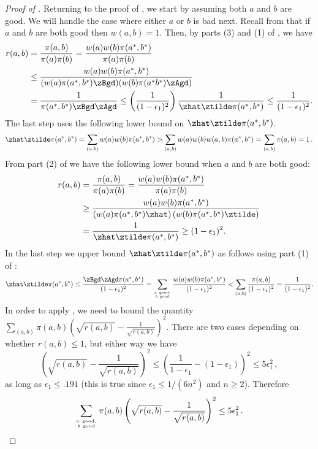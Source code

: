 \begin{proof}[Proof of ]
Returning to the proof of , we start by assuming 
both $a$ and $b$ are good.  We will handle the case where either $a$ or $b$ is bad next.  
Recall from  that if $a$ and $b$ are both good then $w(a,b) = 1$.  Then, by parts (3) and 
(1) of , we have
\begin{align*}
  r(a,b)&=\frac{\pi(a,b)}{\pi(a)\pi(b)}=\frac{w(a)w(b)\pi(a^*,b^*)}{\pi(a)\pi(b)}\\
  &\leq \frac{w(a)w(b)\pi(a^*,b^*)}{(w(a)\pi(a^*,b^*)\zBgd)(w(b) \pi(a^*b^*)\zAgd)}\\
  &= \frac{1}{\pi(a^*,b^*)\zBgd\zAgd}\leq \left(\frac{1}{(1-\epsilon_1)^2}\right) \frac{1}{\zhat\ztilde \pi(a^*,b^*)} \leq \frac{1}{(1-\epsilon_1)^2}.
\end{align*}
The last step uses the following lower bound on $\zhat\ztilde\pi(a^*,b^*)$.
 $$\zhat\ztilde\pi(a^*,b^*) =\sum_{(a,b)} w(a)w(b) \pi(a^*,b^*) > \sum_{(a,b)} w(a)w(b) w(a,b)\pi(a^*,b^*)  = \sum_{(a,b)} \pi(a,b) = 1\,.$$
From part (2) of  we have the following lower 
bound when $a$ and $b$ are both good:
\begin{align*}
  r(a,b)&=\frac{\pi(a,b)}{\pi(a)\pi(b)}=\frac{w(a)w(b)\pi(a^*,b^*)}{\pi(a)\pi(b)}\\
  &\geq \frac{w(a)w(b)\pi(a^*,b^*)}{
     \left(w(a)\pi(a^*,b^*)\zhat\right)\left(w(b)\pi(a^*,b^*)\ztilde\right)}\\
  &= \frac{1}{
     \zhat\ztilde\pi(a^*,b^*)} \geq(1-\epsilon_1)^2.
\end{align*}
In the last step we upper bound $\zhat\ztilde\pi(a^*,b^*)$ as follows 
using part (1) of :
\begin{equation*}\label{prodBound}
\zhat\ztilde\pi(a^*,b^*) \leq\frac{\zBgd\zAgd\pi(a^*,b^*)}{ (1-\epsilon_1)^{2}}= \sum_{a~\text{good},\atop b~\text{good}} \frac{w(a)w(b) \pi(a^*,b^*)}{(1-\epsilon_1)^{2}}< \sum_{(a,b)}\frac{ \pi(a,b)}{(1-\epsilon_1)^{2}} = \frac{1}{(1-\epsilon_1)^{2}}.
\end{equation*}
In order to apply , we need to bound the 
quantity $\sum_{(a,b)}\pi(a,b)\left(\sqrt{r(a,b)}-\frac{1}{\sqrt{r(a,b)}}\right)^2$.  
There are two cases depending on whether $r(a,b)\leq 1$, but either
way we have
\[\left(\sqrt{r(a,b)}-\frac{1}{\sqrt{r(a,b)}}\right)^2\leq
  \left(\frac{1}{1-\epsilon_1} - (1-\epsilon_1)\right)^2\leq
  5\epsilon_1^2\,,\]
as long as $\epsilon_1\leq .191$ (this is true since $\epsilon_1\leq 
1/(6n^2)$ and $n\geq 2$).  Therefore
  \[\sum_{a~\text{good},\atop
    b~\text{good}}\pi(a,b)\left(\sqrt{r(a,b)}-\frac{1}{\sqrt{r(a,b)}}\right)^2\leq
  5\epsilon_1^2\,.\]
  

\end{proof}
